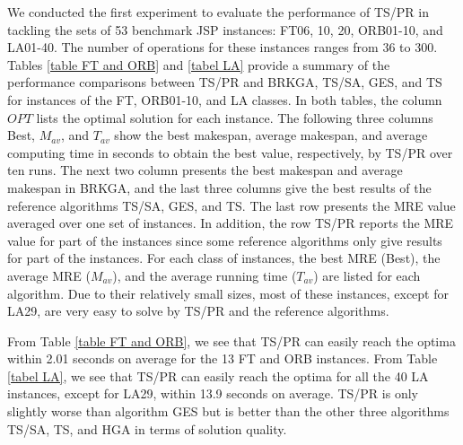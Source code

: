 \documentclass[authoryear,12pt]{elsarticle}
\begin{document}
We conducted the first experiment to evaluate the performance of TS/PR in tackling the sets of 53 benchmark JSP instances: FT06, 10, 20, ORB01-10, and LA01-40. The number of operations for these instances ranges from 36 to 300. Tables \ref{table FT and ORB} and \ref{tabel LA} provide a summary of the performance comparisons between TS/PR and BRKGA, TS/SA, GES, and TS for instances of the FT, ORB01-10, and LA classes. In both tables, the column $OPT$ lists the optimal solution for each instance. The following three columns Best, $M_{av}$, and $T_{av}$ show the best makespan, average makespan, and average computing time in seconds to obtain the best value, respectively, by TS/PR over ten runs. The next two column presents the best makespan and average makespan in BRKGA, and the last three columns give the best results of the reference algorithms TS/SA, GES, and TS. The last row presents the MRE value averaged over one set of instances. In addition, the row TS/PR reports the MRE value for part of the instances since some reference algorithms only give results for part of the instances.  For each class of instances, the best MRE (Best), the average MRE ($M_{av}$), and the average running time ($T_{av}$) are listed for each algorithm. Due to their relatively small sizes, most of these instances, except for LA29, are very easy to solve by TS/PR and the reference algorithms.

From Table \ref{table FT and ORB}, we see that TS/PR can easily reach the optima within 2.01 seconds on average for the 13 FT and ORB instances. From Table \ref{tabel LA}, we see that TS/PR can easily reach the optima for all the 40 LA instances, except for LA29, within 13.9 seconds on average. TS/PR is only slightly worse than algorithm GES but is better than the other three algorithms TS/SA, TS, and HGA in terms of solution quality.
\end{document}
